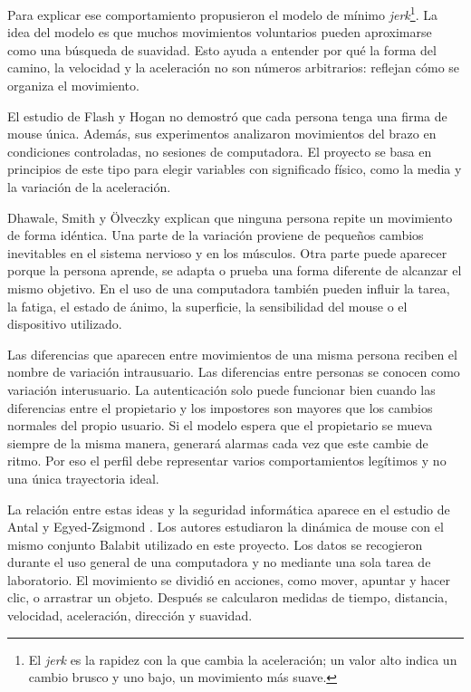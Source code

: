 \documentclass[11pt,letterpaper]{article}
\begin{document}
Para explicar ese comportamiento propusieron el modelo de mínimo \emph{jerk}\footnote{El \emph{jerk} es la rapidez
con la que cambia la aceleración; un valor alto indica un cambio brusco y uno bajo, un movimiento más suave.}. La idea
del modelo es que muchos movimientos voluntarios pueden aproximarse como una búsqueda de suavidad. Esto ayuda a
entender por qué la forma del camino, la velocidad y la aceleración no son números arbitrarios: reflejan cómo se
organiza el movimiento.

El estudio de Flash y Hogan no demostró que cada persona tenga una firma de mouse única. Además, sus experimentos
analizaron movimientos del brazo en condiciones controladas, no sesiones de computadora. El proyecto se basa en
principios de este tipo para elegir variables con significado físico, como la media y la variación de la aceleración.


Dhawale, Smith y Ölveczky \cite{dhawale2017} explican que ninguna persona repite un movimiento de forma idéntica. Una
parte de la variación proviene de pequeños cambios inevitables en el sistema nervioso y en los músculos. Otra parte
puede aparecer porque la persona aprende, se adapta o prueba una forma diferente de alcanzar el mismo objetivo. En el
uso de una computadora también pueden influir la tarea, la fatiga, el estado de ánimo, la superficie, la sensibilidad
del mouse o el dispositivo utilizado.

Las diferencias que aparecen entre movimientos de una misma persona reciben el nombre de variación intrausuario. Las
diferencias entre personas se conocen como variación interusuario. La autenticación solo puede funcionar bien cuando
las diferencias entre el propietario y los impostores son mayores que los cambios normales del propio usuario. Si el
modelo espera que el propietario se mueva siempre de la misma manera, generará alarmas cada vez que este cambie de
ritmo. Por eso el perfil debe representar varios comportamientos legítimos y no una única trayectoria ideal.

La relación entre estas ideas y la seguridad informática aparece en el estudio de Antal y Egyed-Zsigmond
\cite{antal2019}. Los autores estudiaron la dinámica de mouse con el mismo conjunto Balabit utilizado en este
proyecto. Los datos se recogieron durante el uso general de una computadora y no mediante una sola tarea de
laboratorio. El movimiento se dividió en acciones, como mover, apuntar y hacer clic, o arrastrar un objeto. Después se
calcularon medidas de tiempo, distancia, velocidad, aceleración, dirección y suavidad.
\end{document}
